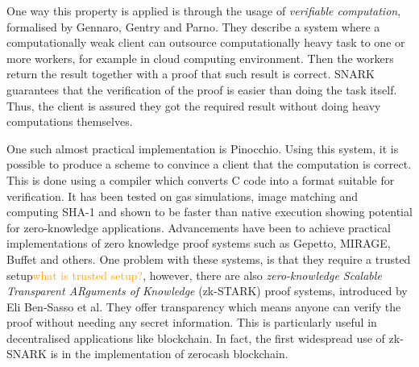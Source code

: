 \documentclass{Resources/UoBLab1}
\theoremstyle{definition}
\begin{document}
One way this property is applied is through the usage of \textit{verifiable computation}, formalised by Gennaro, Gentry and Parno\cite{UntrustedWorkers}. They describe a system where a computationally weak client can outsource computationally heavy task to one or more workers, for example in cloud computing environment. Then the workers return the result together with a proof that such result is correct. SNARK guarantees that the verification of the proof is easier than doing the task itself. Thus, the client is assured they got the required result without doing heavy computations themselves.

One such almost practical implementation is Pinocchio\cite{Pinocchio}. Using this system, it is possible to produce a scheme to convince a client that the computation is correct. This is done using a compiler which converts C code into a format suitable for verification. It has been tested on gas simulations, image matching and computing SHA-1 and shown to be faster than native execution showing potential for zero-knowledge applications. Advancements have been to achieve practical implementations of zero knowledge proof systems such as Gepetto\cite{Gepetto}, MIRAGE\cite{Mirage}, Buffet\cite{Buffet} and others. One problem with these systems, is that they require a trusted setup\textcolor{orange}{what is trusted setup?}, however, there are also \textit{zero-knowledge Scalable Transparent ARguments of Knowledge} (zk-STARK) proof systems, introduced by Eli Ben-Sasso et al\cite{STARK}. They offer transparency which means anyone can verify the proof without needing any secret information. This is particularly useful in decentralised applications like blockchain. In fact, the first widespread use of zk-SNARK is in the implementation of zerocash blockchain\cite{zcash}.\medskip
\end{document}
